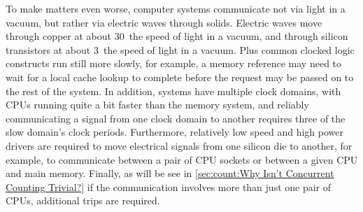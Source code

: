 To make matters even worse, computer systems communicate not via light
in a vacuum, but rather via electric waves through solids.
Electric waves move through copper at about 30\pct\ the speed of light
in a vacuum, and through silicon transistors at about 3\pct\ the speed
of light in a vacuum.
Plus common clocked logic constructs run still more slowly, for example,
a memory reference may need to wait for a local cache lookup to complete
before the request may be passed on to the rest of the system.
In addition, systems have multiple clock domains, with CPUs running
quite a bit faster than the memory system, and reliably communicating
a signal from one clock domain to another requires three of the slow
domain's clock periods.
Furthermore, relatively low speed and high power drivers are required
to move electrical signals from one silicon die to another, for example,
to communicate between a pair of CPU sockets or between a given CPU and
main memory.
Finally, as will be see in
\cref{sec:count:Why Isn't Concurrent Counting Trivial?}
if the communication involves more than just one pair of
CPUs, additional trips are required.

